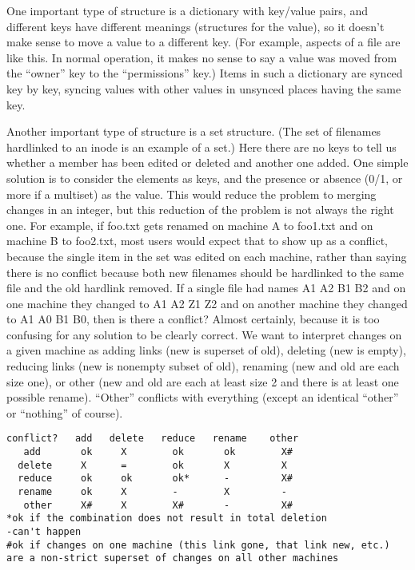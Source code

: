 \documentclass{book}
\begin{document}
One important type of structure is a dictionary with key/value pairs, and different keys have different meanings (structures for the value), so it doesn't make sense to move a value to a different key.  (For example, aspects of a file are like this.  In normal operation, it makes no sense to say a value was moved from the ``owner'' key to the ``permissions'' key.)  Items in such a dictionary are synced key by key, syncing values with other values in unsynced places having the same key.

Another important type of structure is a set structure.  (The set of filenames hardlinked to an inode is an example of a set.)  Here there are no keys to tell us whether a member has been edited or deleted and another one added.  One simple solution is to consider the elements as keys, and the presence or absence (0/1, or more if a multiset) as the value.  This would reduce the problem to merging changes in an integer, but this reduction of the problem is not always the right one.  For example, if foo.txt gets renamed on machine A to foo1.txt and on machine B to foo2.txt, most users would expect that to show up as a conflict, because the single item in the set was edited on each machine, rather than saying there is no conflict because both new filenames should be hardlinked to the same file and the old hardlink removed.  If a single file had names A1 A2 B1 B2 and on one machine they changed to A1 A2 Z1 Z2 and on another machine they changed to A1 A0 B1 B0, then is there a conflict?  Almost certainly, because it is too confusing for any solution to be clearly correct.  We want to interpret changes on a given machine as adding links (new is superset of old), deleting (new is empty), reducing links (new is nonempty subset of old), renaming (new and old are each size one), or other (new and old are each at least size 2 and there is at least one possible rename).  ``Other'' conflicts with everything (except an identical ``other'' or ``nothing'' of course).

\begin{verbatim}
conflict?   add   delete   reduce   rename    other
   add       ok     X        ok       ok        X#
  delete     X      =        ok       X         X
  reduce     ok     ok       ok*      -         X#
  rename     ok     X        -        X         -
   other     X#     X        X#       -         X#
*ok if the combination does not result in total deletion
-can't happen
#ok if changes on one machine (this link gone, that link new, etc.) are a non-strict superset of changes on all other machines
\end{verbatim}
\end{document}
